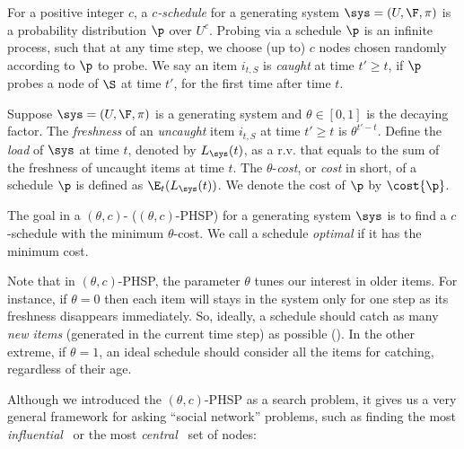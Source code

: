 \begin{definition}[Schedule]
 For a positive integer $c$, a \emph{$c$-schedule} for a generating system $\sys=(U,\F,\pi)$ is a probability distribution $\p$ over $U^c$. Probing via  a schedule $\p$ is an infinite process, such that at any time step, we choose (up to) $c$ nodes chosen randomly according to $\p$ to probe. We say an item $i_{t,S}$ is \emph{caught} at time $t'\geq t$, if $\p$ probes a node of $\S$ at time $t'$, for the first time after time $t$.
\end{definition}

\begin{definition}[Cost]
Suppose $\sys =(U,\F,\pi)$ is a generating system and $\theta\in[0,1]$ is the decaying factor. The \emph{freshness} of an \emph{uncaught} item $i_{t,S}$ at time $t'\geq t$ is $\theta^{t'-t}$. Define the \emph{load} of $\sys$ at time $t$, denoted by $L_\sys(t)$, as a r.v. that equals to the sum of the freshness of uncaught items at time $t$. The $\theta$-\emph{cost}, or \emph{cost} in short, of a schedule $\p$ is defined as $\E_{t}(L_\sys(t))$. We denote the cost of $\p$ by $\cost{\p}$.
\end{definition}

\begin{definition}[\probname]
 The goal in a $(\theta,c)$-{\probname} ($(\theta,c)$-PHSP) for a generating system $\sys$ is to find  a $c$-schedule with the minimum $\theta$-cost. We call a schedule \emph{optimal} if it has the minimum cost.
\end{definition}

Note that in $(\theta,c)$-PHSP, the parameter $\theta$ tunes our interest in older items. For instance, if $\theta=0$ then each item will stays in the system only for one step as its freshness disappears immediately. So, ideally, a schedule should catch as many \emph{new items} (generated in the current time step) as possible (). In the other extreme, if $\theta=1$, an ideal schedule should consider all the items for catching, regardless of their age.

Although we introduced the $(\theta,c)$-PHSP as a search problem, it gives us a very general framework for asking ``social network'' problems, such as finding the most \emph{influential}~\cite{borgs2014maximizing,kempe} or the most \emph{central}~\cite{yoshida2014almost} set of nodes:
 

